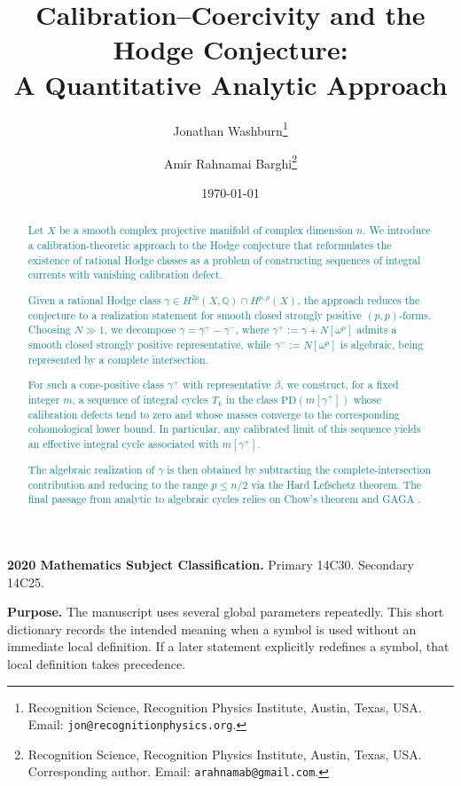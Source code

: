 \documentclass[11pt]{article}
\title{\bfseries Calibration--Coercivity and the Hodge Conjecture:\\
	A Quantitative Analytic Approach}
\author{
    Jonathan Washburn\thanks{Recognition Science, Recognition Physics Institute,
        Austin, Texas, USA. Email: \texttt{jon@recognitionphysics.org}.}
    \and
    Amir Rahnamai Barghi\thanks{Recognition Science, Recognition Physics Institute,
    Austin, Texas, USA. Corresponding author.
        Email: \texttt{arahnamab@gmail.com}.}
}
\date{\today}
\newcommand{\REVMZ}[1]{\textcolor{teal}{#1}}  %
\numberwithin{equation}{section}  %
\theoremstyle{plain}
\theoremstyle{definition}
\theoremstyle{remark}
\newcommand{\Q}{\mathbb{Q}}
\begin{document}
	\maketitle

\begin{abstract}
\REVMZ{Let $X$ be a smooth complex projective manifold of complex dimension $n$. 
We introduce a calibration-theoretic approach to the Hodge conjecture that reformulates the existence of rational Hodge classes as a problem of constructing sequences of integral currents with vanishing calibration defect.

Given a rational Hodge class $\gamma \in H^{2p}(X,\Q) \cap H^{p,p}(X)$, the approach reduces the conjecture to a realization statement for smooth closed strongly positive $(p,p)$-forms. Choosing $N \gg 1$, we decompose $\gamma = \gamma^+ - \gamma^-$, where $\gamma^+ := \gamma + N[\omega^p]$ admits a smooth closed strongly positive representative, while $\gamma^- := N[\omega^p]$ is algebraic, being represented by a complete intersection.

For such a cone-positive class $\gamma^+$ with representative $\beta$, we construct, for a fixed integer $m$, a sequence of integral cycles $T_k$ in the class $\mathrm{PD}(m[\gamma^+])$ whose calibration defects tend to zero and whose masses converge to the corresponding cohomological lower bound. In particular, any calibrated limit of this sequence yields an effective integral cycle associated with $m[\gamma^+]$.

The algebraic realization of $\gamma$ is then obtained by subtracting the complete-intersection contribution and reducing to the range $p \le n/2$ via the Hard Lefschetz theorem. The final passage from analytic to algebraic cycles relies on Chow's theorem and GAGA \cite{Hartshorne77,GH78,Serre56,Chow49}.}
\end{abstract}
\noindent\textbf{2020 Mathematics Subject Classification.}
\noindent Primary 14C30.
\noindent Secondary 14C25.
\\ \newline 

\noindent\textbf{Purpose.} The manuscript uses several global parameters repeatedly.  This short dictionary
records the intended meaning when a symbol is used without an immediate local definition.  If a later
statement explicitly redefines a symbol, that local definition takes precedence.

\end{document}
